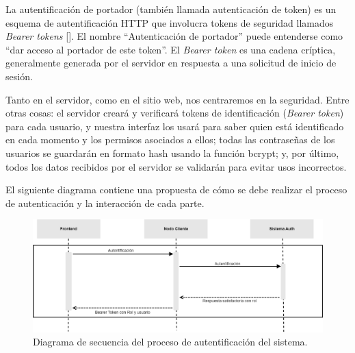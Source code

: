 
La autentificación de portador (también llamada autenticación de token) es un esquema de autentificación HTTP que involucra tokens de seguridad llamados \textit{Bearer tokens} [\cite{98}]. El nombre ``Autenticación de portador'' puede entenderse como ``dar acceso al portador de este token''. El \textit{Bearer token} es una cadena críptica, generalmente generada por el servidor en respuesta a una solicitud de inicio de sesión.

Tanto en el servidor, como en el sitio web, nos centraremos en la seguridad. Entre otras cosas: el servidor creará y verificará tokens de identificación (\textit{Bearer token}) para cada usuario, y nuestra interfaz los usará para saber quien está identificado en cada momento y los permisos asociados a ellos; todas las contraseñas de los usuarios se guardarán en formato hash usando la función bcrypt; y, por último, todos los datos recibidos por el servidor se validarán para evitar usos incorrectos.


El siguiente diagrama contiene una propuesta de cómo se debe realizar el proceso de autenticación y la interacción de cada parte.

\begin{figure}[!h]
\centering
\includegraphics[width=\textwidth]{Graphics/authtt}
\caption{Diagrama de secuencia del proceso de autentificación del sistema.}
\label{fig:autht}
\end{figure}

